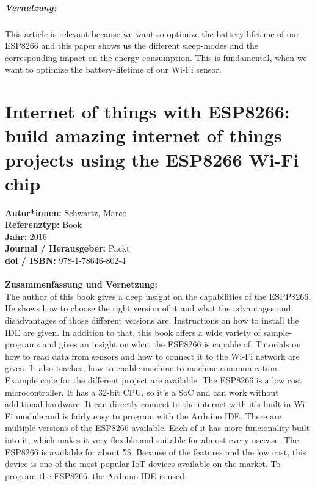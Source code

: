 \documentclass{report}
\newcommand{\createBookHeader}[1]{
    {\let\clearpage\relax \chapter{\citetitle{#1}}}
    \noindent
    \textbf{Autor*innen:} \citeauthor{#1} \\
    \textbf{Referenztyp:} Book\\
    \textbf{Jahr:} \citeyear{#1} \\
    \textbf{Journal / Herausgeber:} \citefield{#1}{publisher}\\
    \textbf{doi / ISBN:} \citefield{#1}{isbn} \\\\
    \textbf{Summary:}\\
}
\begin{document}
\paragraph{Vernetzung:}
This article is relevant because we want so optimize the battery-lifetime of our ESP8266 and this paper shows us the different sleep-modes and the corresponding impact on the energy-consumption. This is fundamental, when we want to optimize the battery-lifetime of our Wi-Fi sensor.


{\let\clearpage\relax \chapter{Internet of things with ESP8266: build amazing internet of things projects using the ESP8266 Wi-Fi chip}}
\noindent
\textbf{Autor*innen:} Schwartz,
Marco\\
\textbf{Referenztyp:} Book\\
\textbf{Jahr:} 2016\\
\textbf{Journal / Herausgeber:} Packt\\
\textbf{doi / ISBN:} 978-1-78646-802-4\\\\
\textbf{Zusammenfassung und Vernetzung:}\\
The author of this book gives a deep insight on the capabilities of the ESPP8266. He shows how to choose the right version of it and what the advantages and disadvantages of those different versions are. Instructions on how to install the IDE are given. In addition to that, this book offers a wide variety of sample-programs and gives an insight on what the ESP8266 is capable of. Tutorials on how to read data from sensors and how to connect it to the Wi-Fi network are given. It also teaches, how to enable machine-to-machine communication. Example code for the different project are available. The ESP8266 is a low cost microcontroller. It has a 32-bit CPU, so it's a SoC and can work without additional hardware. It can directly connect to the internet with it's built in Wi-Fi module and is fairly easy to program with the Arduino IDE. There are multiple versions of the ESP8266 available. Each of it has more funcionality built into it, which makes it very flexible and suitable for almost every usecase. The ESP8266 is available for about 5\$. Because of the features and the low cost, this device is one of the most popular IoT devices available on the market. To program the ESP8266, the Arduino IDE is used.\\
\end{document}

